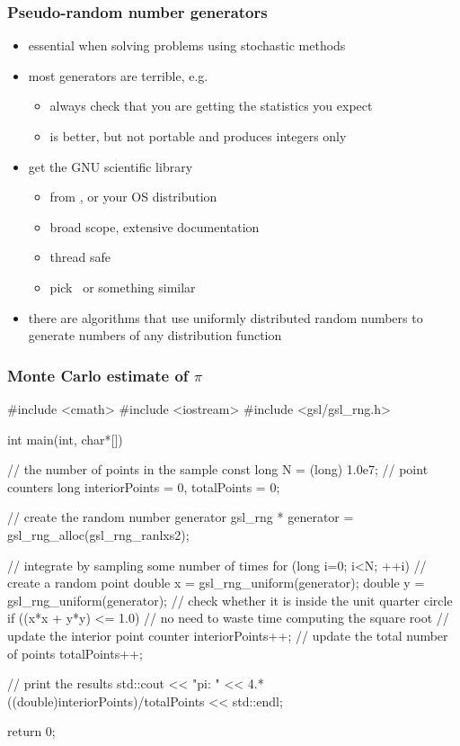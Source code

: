\begin{frame}[fragile]
%
  \frametitle{Pseudo-random number generators}
%
  \begin{itemize}
%
  \item essential when solving problems using stochastic methods
  \item most generators are terrible, e.g.~
    \begin{itemize}
    \item always check that you are getting the statistics you expect
    \item {} is better, but not portable and produces integers only
    \end{itemize}
  \item get the GNU scientific library
    \begin{itemize}
    \item from \href{http://www.gnu.org/software/gsl}, or your OS distribution
    \item broad scope, extensive documentation
    \item thread safe
    \item pick \RANLUX\ or something similar
    \end{itemize}
%
  \item there are algorithms that use uniformly distributed random numbers to generate numbers
    of any distribution function
%
  \end{itemize}
%
\end{frame}

\begin{frame}[fragile]
%
  \frametitle{Monte Carlo estimate of $\pi$}
%
\begin{C}[basicstyle=\tt\bfseries\tiny]
#include <cmath>
#include <iostream>
#include <gsl/gsl_rng.h>

int main(int, char*[]) {
    // the number of points in the sample
    const long N = (long) 1.0e7;
    // point counters
    long interiorPoints = 0, totalPoints = 0;

    // create the random number generator
    gsl_rng * generator = gsl_rng_alloc(gsl_rng_ranlxs2);

    // integrate by sampling some number of times
    for (long i=0; i<N; ++i) {
        // create a random point
        double x = gsl_rng_uniform(generator);
        double y = gsl_rng_uniform(generator);
        // check whether it is inside the unit quarter circle
        if ((x*x + y*y) <= 1.0) { // no need to waste time computing the square root
            // update the interior point counter
            interiorPoints++;
        }
        // update the total number of points
        totalPoints++;
    }

    // print the results
    std::cout << "pi: " << 4.*((double)interiorPoints)/totalPoints << std::endl;

    return 0;
}
\end{C}
%
\end{frame}

